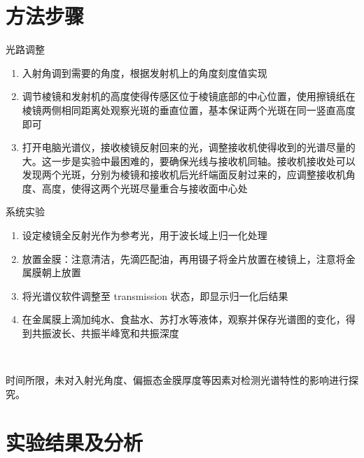 \documentclass{beamer}
\begin{document}
\section{方法步骤}
\begin{frame}{光路调整}
  \begin{enumerate}
    \item 入射角调到需要的角度，根据发射机上的角度刻度值实现
    \item 调节棱镜和发射机的高度使得传感区位于棱镜底部的中心位置，使用擦镜纸在棱镜两侧相同距离处观察光斑的垂直位置，基本保证两个光斑在同一竖直高度即可
    \item 打开电脑光谱仪，接收棱镜反射回来的光，调整接收机使得收到的光谱尽量的大。这一步是实验中最困难的，要确保光线与接收机同轴。接收机接收处可以发现两个光斑，分别为棱镜和接收机后光纤端面反射过来的，应调整接收机角度、高度，使得这两个光斑尽量重合与接收面中心处
  \end{enumerate}
\end{frame}
\begin{frame}{系统实验}
  \begin{enumerate}
    \item 设定棱镜全反射光作为参考光，用于波长域上归一化处理
    \item 放置金膜：注意清洁，先滴匹配油，再用镊子将金片放置在棱镜上，注意将金属膜朝上放置
    \item 将光谱仪软件调整至 transmission 状态，即显示归一化后结果
    \item 在金属膜上滴加纯水、食盐水、苏打水等液体，观察并保存光谱图的变化，得到共振波长、共振半峰宽和共振深度
  \end{enumerate}
  \

  \pause
  时间所限，未对入射光角度、偏振态金膜厚度等因素对检测光谱特性的影响进行探究。
\end{frame}

\section{实验结果及分析}
\end{document}
